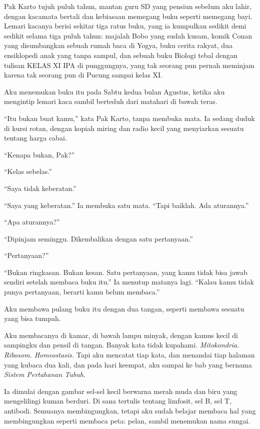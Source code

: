 \documentclass[11pt,twoside,openany]{book}
\makeatletter
\newcommand{\scenebreak}{\par\vspace{0.9em}{\centering\textsc{*\hspace{0.7em}*\hspace{0.7em}*}\par}\vspace{0.9em}\@afterindentfalse\@afterheading}
\makeatother
\begin{document}
Pak Karto tujuh puluh tahun, mantan guru SD yang pensiun sebelum aku lahir, dengan kacamata bertali dan kebiasaan memegang buku seperti memegang bayi. Lemari kacanya berisi sekitar tiga ratus buku, yang ia kumpulkan sedikit demi sedikit selama tiga puluh tahun: majalah Bobo yang sudah kusam, komik Conan yang disumbangkan sebuah rumah baca di Yogya, buku cerita rakyat, dua ensiklopedi anak yang tanpa sampul, dan sebuah buku Biologi tebal dengan tulisan KELAS XI IPA di punggungnya, yang tak seorang pun pernah meminjam karena tak seorang pun di Pucung sampai kelas XI.

Aku menemukan buku itu pada Sabtu kedua bulan Agustus, ketika aku mengintip lemari kaca sambil berteduh dari matahari di bawah teras.

``Itu bukan buat kamu,'' kata Pak Karto, tanpa membuka mata. Ia sedang duduk di kursi rotan, dengan kopiah miring dan radio kecil yang menyiarkan sesuatu tentang harga cabai.

``Kenapa bukan, Pak?''

``Kelas sebelas.''

``Saya tidak keberatan.''

``Saya yang keberatan.'' Ia membuka satu mata. ``Tapi baiklah. Ada aturannya.''

``Apa aturannya?''

``Dipinjam seminggu. Dikembalikan dengan satu pertanyaan.''

``Pertanyaan?''

``Bukan ringkasan. Bukan kesan. Satu pertanyaan, yang kamu tidak bisa jawab sendiri setelah membaca buku itu.'' Ia menutup matanya lagi. ``Kalau kamu tidak punya pertanyaan, berarti kamu belum membaca.''

Aku membawa pulang buku itu dengan dua tangan, seperti membawa sesuatu yang bisa tumpah.

\scenebreak
Aku membacanya di kamar, di bawah lampu minyak, dengan kamus kecil di sampingku dan pensil di tangan. Banyak kata tidak kupahami. \emph{Mitokondria. Ribosom. Homeostasis.} Tapi aku mencatat tiap kata, dan menandai tiap halaman yang kubaca dua kali, dan pada hari keempat, aku sampai ke bab yang bernama \emph{Sistem Pertahanan Tubuh}.

Ia dimulai dengan gambar sel-sel kecil berwarna merah muda dan biru yang mengelilingi kuman berduri. Di sana tertulis tentang limfosit, sel B, sel T, antibodi. Semuanya membingungkan, tetapi aku sudah belajar membaca hal yang membingungkan seperti membaca peta: pelan, sambil menemukan nama sungai.
\end{document}
